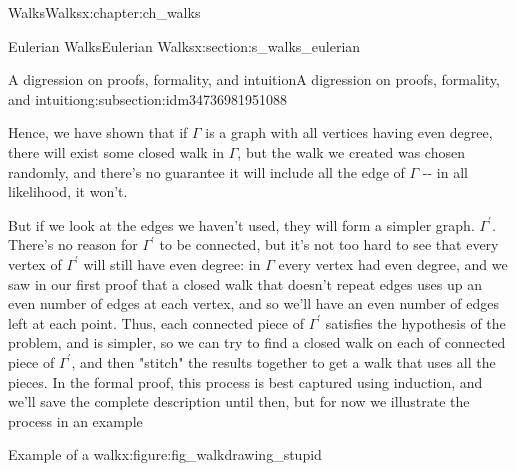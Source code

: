 \documentclass[oneside,10pt,]{book}
\numberwithin{equation}{section}
\begin{document}
\begin{chapterptx}{Walks}{}{Walks}{}{}{x:chapter:ch_walks}
\begin{sectionptx}{Eulerian Walks}{}{Eulerian Walks}{}{}{x:section:s_walks_eulerian}
\begin{subsectionptx}{A digression on proofs, formality, and intuition}{}{A digression on proofs, formality, and intuition}{}{}{g:subsection:idm34736981951088}
\par
Hence, we have shown that if \(\Gamma\) is a graph with all vertices having even degree, there will exist some closed walk in \(\Gamma\), but the walk we created was chosen randomly, and there's no guarantee it will include all the edge of \(\Gamma\) -{}-{} in all likelihood, it won't.%
\par
But if we look at the edges we haven't used, they will form a simpler graph. \(\Gamma^\prime\).  There's no reason for \(\Gamma^\prime\) to be connected, but it's not too hard to see that every vertex of \(\Gamma^\prime\) will still have even degree: in \(\Gamma\) every vertex had even degree, and we saw in our first proof that a closed walk that doesn't repeat edges uses up an even number of edges at each vertex, and so we'll have an even number of edges left at each point.  Thus, each connected piece of \(\Gamma^\prime\) satisfies the hypothesis of the problem, and is simpler, so we can try to find a closed walk on each of connected piece of \(\Gamma^\prime\), and then "stitch" the results together to get a walk that uses all the pieces. In the formal proof, this process is best captured using induction, and we'll save the complete description until then, but for now we illustrate the process in an example%
\begin{figureptx}{Example of a walk}{x:figure:fig_walkdrawing_stupid}{}%
\begin{image}{0.15}{0.7}{0.15}%
\end{image}
\end{figureptx}
\end{subsectionptx}
\end{sectionptx}
\end{chapterptx}
\end{document}
